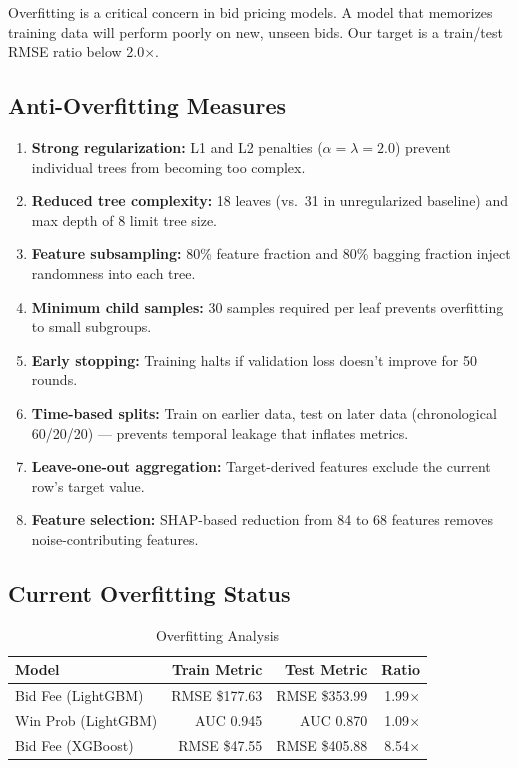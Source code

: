 \documentclass[12pt,a4paper]{article}
\begin{document}
Overfitting is a critical concern in bid pricing models. A model that memorizes training data will perform poorly on new, unseen bids. Our target is a train/test RMSE ratio below 2.0$\times$.

\subsection{Anti-Overfitting Measures}

\begin{enumerate}[nosep]
    \item \textbf{Strong regularization:} L1 and L2 penalties ($\alpha = \lambda = 2.0$) prevent individual trees from becoming too complex.
    \item \textbf{Reduced tree complexity:} 18 leaves (vs.\ 31 in unregularized baseline) and max depth of 8 limit tree size.
    \item \textbf{Feature subsampling:} 80\% feature fraction and 80\% bagging fraction inject randomness into each tree.
    \item \textbf{Minimum child samples:} 30 samples required per leaf prevents overfitting to small subgroups.
    \item \textbf{Early stopping:} Training halts if validation loss doesn't improve for 50 rounds.
    \item \textbf{Time-based splits:} Train on earlier data, test on later data (chronological 60/20/20) --- prevents temporal leakage that inflates metrics.
    \item \textbf{Leave-one-out aggregation:} Target-derived features exclude the current row's target value.
    \item \textbf{Feature selection:} SHAP-based reduction from 84 to 68 features removes noise-contributing features.
\end{enumerate}

\subsection{Current Overfitting Status}

\begin{table}[H]
\centering
\caption{Overfitting Analysis}
\label{tab:overfitting}
\begin{tabular}{lrrr}
\toprule
\textbf{Model} & \textbf{Train Metric} & \textbf{Test Metric} & \textbf{Ratio} \\
\midrule
Bid Fee (LightGBM) & RMSE \$177.63 & RMSE \$353.99 & 1.99$\times$ \\
Win Prob (LightGBM) & AUC 0.945 & AUC 0.870 & 1.09$\times$ \\
Bid Fee (XGBoost) & RMSE \$47.55 & RMSE \$405.88 & 8.54$\times$ \\
\bottomrule
\end{tabular}
\end{table}
\end{document}
